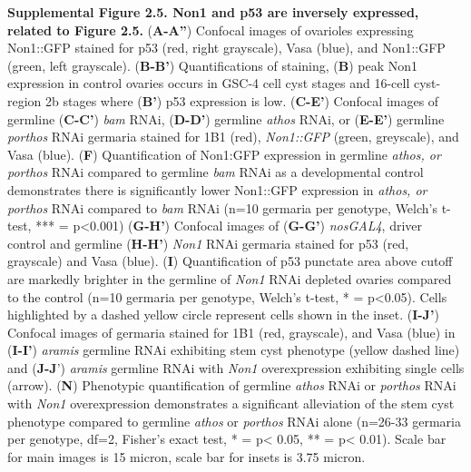\documentclass[12pt,twoside]{reedthesis}
\begin{document}
\textbf{Supplemental Figure 2.5. Non1 and p53 are inversely expressed, related
to Figure 2.5.} (\textbf{A-A''}) Confocal images of ovarioles expressing
Non1::GFP stained for p53 (red, right grayscale), Vasa (blue), and
Non1::GFP (green, left grayscale). (\textbf{B-B'}) Quantifications of
staining, (\textbf{B}) peak Non1 expression in control ovaries occurs in
GSC-4 cell cyst stages and 16-cell cyst-region 2b stages where (\textbf{B'})
p53 expression is low. (\textbf{C-E'}) Confocal images of germline (\textbf{C-C'})
\emph{bam} RNAi, (\textbf{D-D'}) germline \emph{athos} RNAi, or (\textbf{E-E'}) germline
\emph{porthos} RNAi germaria stained for 1B1 (red), \emph{Non1::GFP} (green,
greyscale), and Vasa (blue). (\textbf{F}) Quantification of Non1:GFP
expression in germline \emph{athos, or porthos} RNAi compared to germline
\emph{bam} RNAi as a developmental control demonstrates there is
significantly lower Non1::GFP expression in \emph{athos, or porthos} RNAi
compared to \emph{bam} RNAi (n=10 germaria per genotype, Welch's t-test,
*** = p\textless0.001) (\textbf{G-H'}) Confocal images of (\textbf{G-G'}) \emph{nosGAL4},
driver control and germline (\textbf{H-H'}) \emph{Non1} RNAi germaria stained for
p53 (red, grayscale) and Vasa (blue). (\textbf{I}) Quantification of p53
punctate area above cutoff are markedly brighter in the germline of
\emph{Non1} RNAi depleted ovaries compared to the control (n=10 germaria per
genotype, Welch's t-test, * = p\textless0.05). Cells highlighted by a dashed
yellow circle represent cells shown in the inset. (\textbf{I-J'}) Confocal
images of germaria stained for 1B1 (red, grayscale), and Vasa (blue) in
(\textbf{I-I'}) \emph{aramis} germline RNAi exhibiting stem cyst phenotype (yellow
dashed line) and (\textbf{J-J}') \emph{aramis} germline RNAi with \emph{Non1}
overexpression exhibiting single cells (arrow). (\textbf{N}) Phenotypic
quantification of germline \emph{athos} RNAi or \emph{porthos} RNAi with \emph{Non1}
overexpression demonstrates a significant alleviation of the stem cyst
phenotype compared to germline \emph{athos} or \emph{porthos} RNAi alone (n=26-33
germaria per genotype, df=2, Fisher's exact test, * = p\textless{} 0.05, ** =
p\textless{} 0.01). Scale bar for main images is 15 micron, scale bar for insets
is 3.75 micron.
\end{document}
